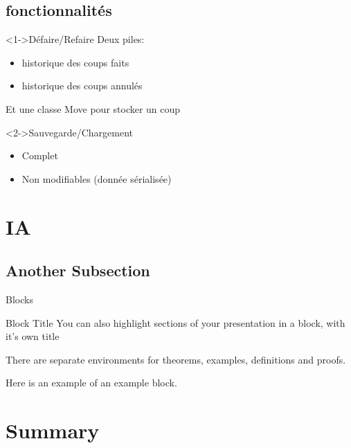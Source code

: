 \documentclass{beamer}
\begin{document}
\subsection{fonctionnalités}
\begin{frame}{}
\begin{block}<1->{Défaire/Refaire} %
Deux piles: 
\begin{itemize}
 \item historique des coups faits 
 \item historique des coups annulés
\end{itemize}
Et une classe Move pour stocker un coup
\end{block}
\begin{block}<2->{Sauvegarde/Chargement}
\begin{itemize}
\item Complet
\item Non modifiables (donnée sérialisée)
\end{itemize}
\end{block}
\end{frame}


\section{IA}

\subsection{Another Subsection}

\begin{frame}{Blocks}
\begin{block}{Block Title}
You can also highlight sections of your presentation in a block, with it's own title
\end{block}
\begin{theorem}
There are separate environments for theorems, examples, definitions and proofs.
\end{theorem}
\begin{example}
Here is an example of an example block.
\end{example}
\end{frame}

\section*{Summary}
\end{document}
